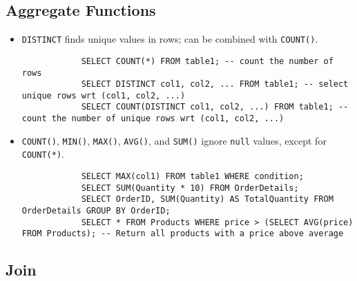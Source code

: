 \documentclass{article}
\begin{document}
	\subsection{Aggregate Functions}
	
	\begin{itemize}
		\item \texttt{\color{red}DISTINCT} finds unique values in rows; can be combined with \texttt{\color{red}COUNT()}.
		
		\begin{lstlisting}
			SELECT COUNT(*) FROM table1; -- count the number of rows
			SELECT DISTINCT col1, col2, ... FROM table1; -- select unique rows wrt (col1, col2, ...)
			SELECT COUNT(DISTINCT col1, col2, ...) FROM table1; -- count the number of unique rows wrt (col1, col2, ...)
		\end{lstlisting}
		
		\item \texttt{\color{red}COUNT()}, \texttt{\color{red}MIN()}, \texttt{\color{red}MAX()}, \texttt{\color{red}AVG()}, and \texttt{\color{red}SUM()} ignore \texttt{null} values, except for \texttt{\color{red}COUNT(*)}.
		
		\begin{lstlisting}
			SELECT MAX(col1) FROM table1 WHERE condition;
			SELECT SUM(Quantity * 10) FROM OrderDetails;
			SELECT OrderID, SUM(Quantity) AS TotalQuantity FROM OrderDetails GROUP BY OrderID;
			SELECT * FROM Products WHERE price > (SELECT AVG(price) FROM Products); -- Return all products with a price above average
		\end{lstlisting}
	\end{itemize}
	
	\subsection{Join}
	
\end{document}
